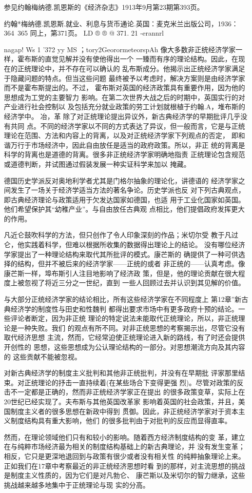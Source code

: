 参见约翰梅纳德.凯恩斯的《经济杂志》1913年9月第23期第393页。

约翰*梅纳德.凯恩斯.就业、利息与货币通论.英国：麦克米兰出版公司，1936：364~365
同上，第371页。
LD
®
®
@
371.
21
-erannrl

nagap!
Ws
1
'372
yy
MS
；tory2GeorormeteorspAh
像大多数非正统经济学家一样，霍布斯的直觉见解并没有使他得出一个
一臻而有序的理论结构。因此，在现在的正统理论中，并不存在可以确认的
乱布斯成分。他揭示出正统经济学家满足于隐藏问题的特点。但当这些问题
最终被予以考虑时，解决方案则是由经济学家而不是霍布斯提出的。不过，
霍布斯对英国的经济政策具有重要作用，因为他的思想成为工党的主要智力
影响。在第二次世界大战之后的时期中，英国实行的对产业进行社会控制以
及包括充分就业政策的劳工计划就根植于约翰.A，堆布斯的经济学中。
冶，革
除了对正统理论提出异议外，新古典经济学的早期批评几乎没有共同
点。不同的经济学家以不同的方式表达了异议，但一般而言，它是与正统
理论在范围、方法和内容上的背离，以及对正统经济学家下列观点的否定，
即和谐万行于市场经济中，因此自由放任是适当的政府政策。所以，非正
统的背离是科学的背离也是道德的背离。很多非正统经济学家明确地指责
正统理论包含规范或道德判断，并试图通过假装发展一种实证科学来加以
掩藏。

德国历史学派反对奥地利学者尤其是门格尔抽象的理论化，讲德语的
经济学家之间发生了一场关于经济学适当方法的著名争论。历史学派也反
对下列古典观点，即古典经济理论与政策适用于欠发达国家如德国，也适
用于工业化国家如英国。他们希望保护其“幼稚产业”。与自由放任古典观
点相比，他们提倡政府发挥更大的作用。

凡近仑鼓吹科学的方法，但只创作了令人印象深刻的作品；米切尔受
教于凡过仑，他实践着科学，但难以根据所收集的数据得出理论上的结论。
没有哪位经济学家提出了一种理论结构来取代其所批评的模式。康芒斯的
确提供了一种可供选择的结构，但并不被后来的经济学家——正统的或者
非正统的——认真考虑。像康芒斯一样，埠布斯引人注目地影响了经济政
策，但是，他的理论贡献在很大程度上被忽视了将近三分之一世纪，直到
一些人回顾过去并认识到其见解的价值。

与大部分正统经济学家的结论相比，所有这些经济学家在不同程度上
第12章”新古典经济学的制度性与田史和性魏判
都得出要求市场中有更多政府十预的结论。一些评论者断定，因为非正统
理论的特定说法未能取代正统理论，所以，非正统理论是一种失败。我们
的观点有所不同。对非正统思想的考察揭示出，尽管它没有取代经济思想
主流，然而，它经常迫使正统理论进入新的路线，有了时还会提供开创性的
思想，这些思想成为公认理论结构的一部分。对思想潮流方向及其内容的
这些贡献不能被忽视。

对新古典经济学的制度主义批判和其他非正统批判，并没有在早期批
评家那里结束。对正统理论的抒击一直持续着(在某些场合下变得更强
烈)。尽管对政策的反击不一定都是正确的，然而非正统经济学家正在提出
的很多政策变草，实际上在20世纪已经实现了。夫布斯与其他英国改革家
影响着英国的社会政策，并且，美国制度主义者的很多思想在新政中得到
贯御。因此，非正统经济学家对于资本主义制度结构具有重大影响，他们
的很多批判由于对批判的反应而显得直率。

然而，在理论领域他们只有和较小的影响。随着西方经济制度结构的变
革，建立在与纯粹市场经济最为相关的制度结构基础上的新古典理论，并
没有发生变革；相反，它只是更深地退回到与政策有很少或者没有相关性
的纯粹抽象理论上来。正如我们在17章中考察最近的非正统经济思想时看
到的那样，对主流思想的挑战是制度主义性质的，因为它们是对凡勃仑、
康芒斯以及米切尔的智力继承，这些挑战越来越多地集中于正统理论与现
实的分高。
